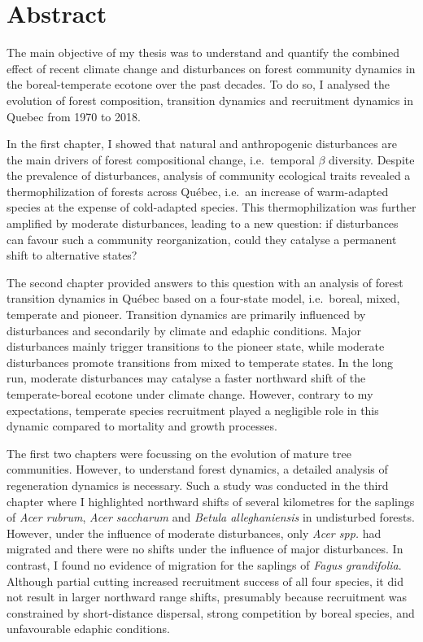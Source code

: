 \anglais

\chapter*{Abstract}

The main objective of my thesis was to understand and quantify the
combined effect of recent climate change and disturbances on forest
community dynamics in the boreal-temperate ecotone over the past
decades. To do so, I analysed the evolution of forest composition,
transition dynamics and recruitment dynamics in Quebec from 1970 to
2018.

In the first chapter, I showed that natural and anthropogenic
disturbances are the main drivers of forest compositional change,
i.e.~temporal \(\beta\) diversity. Despite the prevalence of
disturbances, analysis of community ecological traits revealed a
thermophilization of forests across Québec, i.e.~an increase of
warm-adapted species at the expense of cold-adapted species. This
thermophilization was further amplified by moderate disturbances,
leading to a new question: if disturbances can favour such a community
reorganization, could they catalyse a permanent shift to alternative
states?

The second chapter provided answers to this question with an analysis of
forest transition dynamics in Québec based on a four-state model,
i.e.~boreal, mixed, temperate and pioneer. Transition dynamics are
primarily influenced by disturbances and secondarily by climate and
edaphic conditions. Major disturbances mainly trigger transitions to the
pioneer state, while moderate disturbances promote transitions from
mixed to temperate states. In the long run, moderate disturbances may
catalyse a faster northward shift of the temperate-boreal ecotone under
climate change. However, contrary to my expectations, temperate species
recruitment played a negligible role in this dynamic compared to
mortality and growth processes.

The first two chapters were focussing on the evolution of mature tree
communities. However, to understand forest dynamics, a detailed analysis
of regeneration dynamics is necessary. Such a study was conducted in the
third chapter where I highlighted northward shifts of several kilometres
for the saplings of \emph{Acer rubrum}, \emph{Acer saccharum} and
\emph{Betula alleghaniensis} in undisturbed forests. However, under the
influence of moderate disturbances, only \emph{Acer spp.} had migrated
and there were no shifts under the influence of major disturbances. In
contrast, I found no evidence of migration for the saplings of
\emph{Fagus grandifolia}. Although partial cutting increased recruitment
success of all four species, it did not result in larger northward range
shifts, presumably because recruitment was constrained by short-distance
dispersal, strong competition by boreal species, and unfavourable
edaphic conditions.

